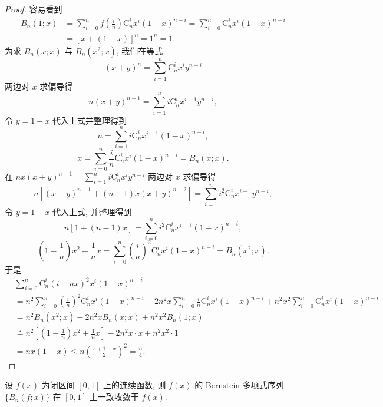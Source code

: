 \begin{proof}
容易看到
\[
  \begin{aligned}
    B_{n}(1;x)&=\sum_{i=0}^{n}f\left(\frac{i}{n}\right)\mathrm{C}_{n}^{i}x^{i}(1-x)^{n-i}=\sum_{i=0}^{n}\mathrm{C}_{n}^{i}x^{i}(1-x)^{n-i}\\
    &=[x+(1-x)]^{n}=1^{n}=1.
  \end{aligned}
\]
为求 $B_{n}(x;x)$ 与 $B_{n}(x^{2};x)$, 我们在等式
\[
  (x+y)^{n}=\sum_{i=1}^{n}\mathrm{C}_{n}^{i}x^{i}y^{n-i}
\]
两边对 $x$ 求偏导得
\[
  n(x+y)^{n-1}=\sum_{i=1}^{n}i\mathrm{C}_{n}^{i}x^{i-1}y^{n-i},
\]
令 $y=1-x$ 代入上式并整理得到
\[
  n=\sum_{i=1}^{n}i\mathrm{C}_{n}^{i}x^{i-1}(1-x)^{n-i},
\]
\[
  x=\sum_{i=0}^{n}\frac{i}{n}\mathrm{C}_{n}^{i}x^{i}(1-x)^{n-i}=B_{n}(x;x).
\]
在 $nx(x+y)^{n-1}=\sum_{i=1}^{n}i\mathrm{C}_{n}^{i}x^{i}y^{n-i}$ 两边对 $x$ 求偏导得
\[
  n\left[(x+y)^{n-1}+(n-1)x(x+y)^{n-2}\right]=\sum_{i=1}^{n}i^{2}\mathrm{C}_{n}^{i}x^{i-1}y^{n-i},
\]
令 $y=1-x$ 代入上式, 并整理得到
\[
  n[1+(n-1)x]=\sum_{i=0}^{n}i^{2}\mathrm{C}_{n}^{i}x^{i-1}(1-x)^{n-i},
\]
\[
  \left(1-\frac{1}{n}\right)x^{2}+\frac{1}{n}x=\sum_{i=0}^{n}\left(\frac{i}{n}\right)^{2}\mathrm{C}_{n}^{i}x^{i}(1-x)^{n-i}=B_{n}(x^{2};x).
\]
于是
\[
  \begin{aligned}
    &\sum_{i=0}^{n}\mathrm{C}_{n}^{i}(i-nx)^{2}x^{i}(1-x)^{n-i}\\
    &=n^{2}\sum_{i=0}^{n}\left(\frac{i}{n}\right)^{2}\mathrm{C}_{n}^{i}x^{i}(1-x)^{n-i}-2n^{2}x\sum_{i=0}^{n}\frac{i}{n}\mathrm{C}_{n}^{i}x^{i}(1-x)^{n-i}+n^{2}x^{2}\sum_{i=0}^{n}\mathrm{C}_{n}^{i}x^{i}(1-x)^{n-i}\\
    &=n^{2}B_{n}(x^{2};x)-2n^{2}xB_{n}(x;x)+n^{2}x^{2}B_{n}(1;x)\\
    &\doteq n^{2}\left[\left(1-\frac{1}{n}\right)x^{2}+\frac{1}{n}x\right]-2n^{2}x\cdot x+n^{2}x^{2}\cdot1\\
    &=nx(1-x)\leqslant n\left(\frac{x+1-x}{2}\right)^{2}=\frac{n}{4}.
  \end{aligned}
\]
\end{proof}

\begin{theorem}[Bernstein]\label{thm:14.3.4}
设 $f(x)$ 为闭区间 $[0,1]$ 上的连续函数, 则 $f(x)$ 的 Bernstein 多项式序列 $\{B_{n}(f;x)\}$ 在 $[0,1]$ 上一致收敛于 $f(x)$.
\end{theorem}

